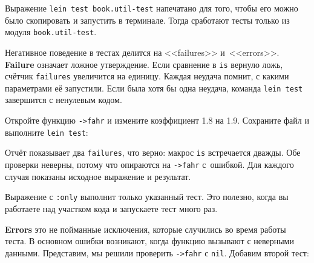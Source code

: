 
Выражение \verb|lein test book.util-test| напечатано для того, чтобы его можно
было скопировать и запустить в терминале. Тогда сработают тесты только из модуля
\verb|book.util-test|.

Негативное поведение в тестах делится на <<failures>>
и~<<errors>>. \textbf{Failure}  означает ложное утверждение. Если
сравнение в \verb|is| вернуло ложь, счётчик \verb|failures| увеличится на
единицу. Каждая неудача помнит, с какими параметрами её запустили. Если была
хотя бы одна неудача, команда \verb|lein test| завершится с ненулевым кодом.

Откройте функцию \verb|->fahr| и измените коэффициент 1.8 на 1.9. Сохраните
файл и выполните \verb|lein test|:

\begin{english}
\end{english}

Отчёт показывает два \verb|failures|, что верно: макрос \verb|is| встречается
дважды. Обе проверки неверны, потому что опираются на \verb|->fahr|
с~ошибкой. Для каждого случая показаны исходное выражение и результат.

Выражение с \verb|:only| выполнит только указанный тест. Это полезно, когда вы
работаете над участком кода и запускаете тест много раз.

\begin{english}
\end{english}


\textbf{Errors} это не пойманные исключения, которые случились во время работы
теста. В основном ошибки возникают, когда функцию вызывают с неверными
данными. Представим, мы решили проверить \verb|->fahr| с \verb|nil|. Добавим
второй тест:

